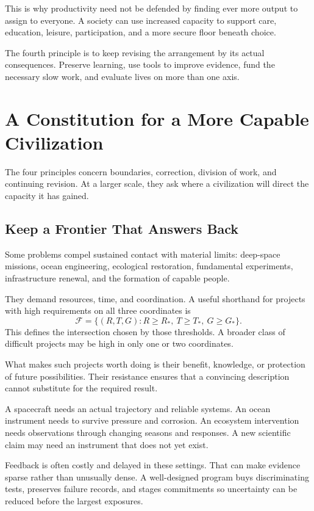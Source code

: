 \documentclass[11pt,openany]{book}
\begin{document}
This is why productivity need not be defended by finding ever more output to assign to everyone. A society can use increased capacity to support care, education, leisure, participation, and a more secure floor beneath choice.

The fourth principle is to keep revising the arrangement by its actual consequences. Preserve learning, use tools to improve evidence, fund the necessary slow work, and evaluate lives on more than one axis.

\section{A Constitution for a More Capable Civilization}

The four principles concern boundaries, correction, division of work, and continuing revision. At a larger scale, they ask where a civilization will direct the capacity it has gained.

\subsection{Keep a Frontier That Answers Back}

Some problems compel sustained contact with material limits: deep-space missions, ocean engineering, ecological restoration, fundamental experiments, infrastructure renewal, and the formation of capable people.

They demand resources, time, and coordination. A useful shorthand for projects with high requirements on all three coordinates is
\begin{equation}
 \mathcal F=
 \{(R,T,G):R\geq R_\ast,\ T\geq T_\ast,\ G\geq G_\ast\}.
\end{equation}
This defines the intersection chosen by those thresholds. A broader class of difficult projects may be high in only one or two coordinates.

What makes such projects worth doing is their benefit, knowledge, or protection of future possibilities. Their resistance ensures that a convincing description cannot substitute for the required result.

A spacecraft needs an actual trajectory and reliable systems. An ocean instrument needs to survive pressure and corrosion. An ecosystem intervention needs observations through changing seasons and responses. A new scientific claim may need an instrument that does not yet exist.

Feedback is often costly and delayed in these settings. That can make evidence sparse rather than unusually dense. A well-designed program buys discriminating tests, preserves failure records, and stages commitments so uncertainty can be reduced before the largest exposures.
\end{document}
